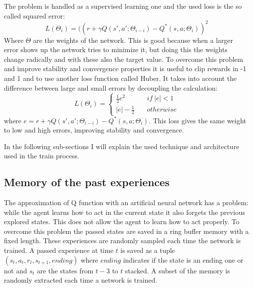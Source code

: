 \documentclass[10pt]{article}
\begin{document}
\begin{multicols}{2}
The problem is handled as a supervised learning one and the used loss is the so called squared error: 
\[
L(\Theta_i) = ((r + \gamma Q(s', a';\Theta_{i-i})- Q^*(s, a;\Theta_{i} ))^2
\]
Where $\Theta$ are the weights of the network. 
This is good because when a larger error shows up the network tries to minimize it, but doing this the weights change radically and with these also the target value. To overcome this problem and improve stability and convergence properties it is useful to clip rewards in -1 and 1 and to use another loss function called Huber. It takes into account the difference between large and small errors by decoupling the calculation: 
\[
 L(\Theta_i)=\left\{
 \begin{array}{ll}
 \frac{1}{2}e^2  & \quad	  if \:|e| < 1 \\
 |e| - \frac{1}{2} & \quad otherwise
 \end{array}
 \right.
\] 
where $e = r + \gamma Q(s', a';\Theta_{i-i})- Q^*(s, a;\Theta_{i} )$. This loss gives the same weight to low and high errors, improving stability and convergence.  

In the following sub-sections I will explain the used technique and architecture used in the train process. 

\subsection{Memory of the past experiences}
The approximation of Q function with an artificial neural network has a problem: while the agent learns how to act in the current state it also forgets the previous explored states. This does not allow the agent to learn how to act properly. To overcome this problem the passed states are saved in a ring buffer memory with a fixed length. These experiences are randomly sampled each time the network is trained. A passed experience at time $t$ is saved as a tuple $(s_t, a_t, r_t, s_{t+1}, ending)$ where $ending$ indicates if the state is an ending one or not and $s_t$ are the states from $t-3$ to $t$ stacked. A subset of the memory is randomly extracted each time a network is trained. 


\end{multicols}
\end{document}
